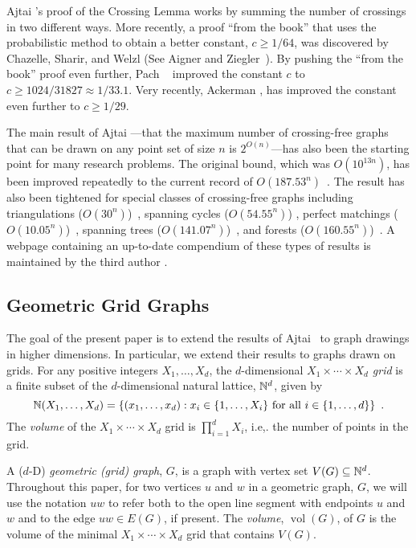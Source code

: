 \documentclass[12pt]{article}
\DeclareMathOperator{\volume}{vol}
\begin{document}
Ajtai \etal's proof of the Crossing Lemma works by summing the number
of crossings in two different ways.  More recently, a proof ``from the
book'' that uses the probabilistic method to obtain a better constant,
$c\ge 1/64$, was discovered by Chazelle, Sharir, and Welzl (See Aigner
and Ziegler~\cite[Chapter~30, Theorem~4]{aigner.ziegler:proofs}).
By pushing the ``from the book'' proof even further, Pach
\etal~\cite{pach.radoicic.ea:improving} improved the constant $c$ to
$c\ge 1024/31827\approx 1/33.1$.  Very recently, Ackerman \cite{ackerman:on},
has improved the constant even further to $c\ge 1/29$.

The main result of Ajtai \etal---that the maximum number
of crossing-free graphs that can be drawn on any point set of
size $n$ is $2^{O(n)}$---has also been the starting point
for many research problems. The original bound, which was
$O(10^{13n})$, has been improved repeatedly to the current record of
$O(187.53^n)$~\cite{sharir.sheffer:counting*1}.  The result has also
been tightened for special classes of crossing-free graphs including
triangulations ($O(30^n)$)~\cite{sharir.sheffer:counting}, spanning
cycles ($O(54.55^n)$) \cite{sharir.sheffer.ea:counting}, perfect
matchings ($O(10.05^n)$)~\cite{sharir.welzl:on}, spanning trees
($O(141.07^n)$)~\cite{hoffmann.sharir.ea:counting}, and forests
($O(160.55^n)$)~\cite{hoffmann.sharir.ea:counting,sharir.sheffer:counting}.
A webpage containing an up-to-date compendium of these types of results
is maintained by the third author \cite{sheffer:numbers}.

\subsection{Geometric Grid Graphs}

The goal of the present paper is to extend the results of Ajtai \etal\
to graph drawings in higher dimensions.  In particular, we extend
their results to graphs drawn on grids.  For any positive integers
$X_1,\ldots,X_d$, the $d$-dimensional \emph{$X_1\times\cdots\times X_d$
grid} is a finite subset of the $d$-dimensional natural lattice, $\mathbb{N}^d$,
given by
\[  \mathbb{N}(X_1,\ldots,X_d) = \{(x_1,\ldots,x_d): 
      \mbox{$x_i\in\{1,\ldots,X_i\}$ for all $i\in\{1,\ldots,d\}$}\}
	\enspace .\]
The \emph{volume} of the $X_1\times\cdots\times X_d$ grid is
$\prod_{i=1}^d X_i$, i.e,. the number of points in the grid.

A ($d$-D) \emph{geometric (grid) graph}, $G$, is a graph with vertex
set $V(G)\subseteq \mathbb{N}^d$.  Throughout this paper, for two vertices $u$
and $w$ in a geometric graph, $G$, we will use the notation $uw$ to
refer both to the open line segment with endpoints $u$ and $w$ and to
the edge $uw\in E(G)$, if present.    The \emph{volume}, $\volume(G)$,
of $G$ is the volume of the minimal $X_1\times\cdots\times X_d$ grid
that contains $V(G)$.
\end{document}
